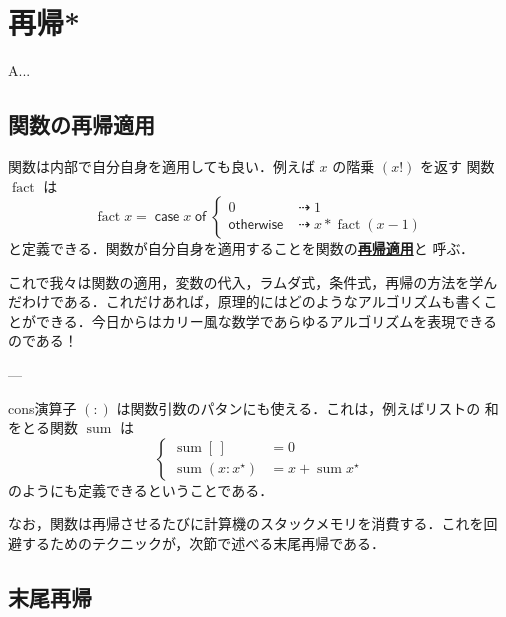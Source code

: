 \documentclass[a5paper,twoside,fleqn,draft]{jsbook}
\newenvironment{leader}{\begingroup\gt}{\endgroup}
\newcommand{\keyword}[1]{{\underline{\textbf{#1}}}}
\newcommand{\mKeyword}[1]{\mathsf{#1}} %
\newcommand{\mCaseKeyword}{\mKeyword{case}}
\newcommand{\mOfKeyword}{\mKeyword{of}}
\newcommand{\mOtherwiseKeyword}{\mKeyword{otherwise}}
\DeclareMathOperator{\mCaseKW}{\mCaseKeyword} %
\DeclareMathOperator{\mOfKW}{\mOfKeyword} %
\DeclareMathOperator{\mOtherwise}{\mOtherwiseKeyword}
\newcommand{\mEmptyList}{{[\,]}}
\newcommand{\mSpecialFunc}[1]{\mathrm{#1}}
\DeclareMathOperator{\mFact}{\mSpecialFunc{fact}}
\DeclareMathOperator{\mSum}{\mSpecialFunc{sum}}
\DeclareMathOperator{\mIfSo}{\dashrightarrow}
\newcommand{\mList}[1]{{#1}^\mathrm{\star}}
\newcommand{\mCaseOf}[1]{\mCaseKW#1\mOfKW}
\begin{document}
\chapter{再帰*}
\label{ch:recursion}

\begin{leader}
A...
\end{leader}


\section{関数の再帰適用}

関数は内部で自分自身を適用しても良い．例えば $x$ の階乗 $(x!)$ を返す
関数 $\mFact$ は
\begin{equation}
  \mFact x=\mCaseOf{x}\begin{cases}
    0&\mIfSo1\\
    \mOtherwise&\mIfSo x*\mFact(x-1)
  \end{cases}
\end{equation}
と定義できる．関数が自分自身を適用することを関数の\keyword{再帰適用}と
呼ぶ．

これで我々は関数の適用，変数の代入，ラムダ式，条件式，再帰の方法を学ん
だわけである．これだけあれば，原理的にはどのようなアルゴリズムも書くこ
とができる．今日からはカリー風な数学であらゆるアルゴリズムを表現できる
のである！

---

cons演算子 $(:)$ は関数引数のパタンにも使える．これは，例えばリストの
和をとる関数 $\mSum$ は
\begin{equation}
\left\{
\begin{aligned}
\mSum\mEmptyList&=0\\ \mSum(x:\mList{x})&=x+\mSum\mList{x}
\end{aligned}
\right.
\end{equation}
のようにも定義できるということである．

なお，関数は再帰させるたびに計算機のスタックメモリを消費する．これを回
避するためのテクニックが，次節で述べる末尾再帰である．

\section{末尾再帰}
\end{document}
